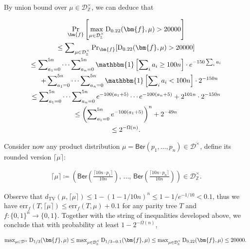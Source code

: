 By union bound over $\mu\in\mathcal{D}^{\times}_{\mathbb{Z}}$, we can deduce that\par


\[\begin{gathered}
\displaystyle\Pr_{\bm{f}}\left[\max_{\mu\in\mathcal{D}^{\times}_{\mathbb{Z}}}{\textup{D}}_{0.22}(\bm{f},\mu)>20000\right] \\
\displaystyle\leq \displaystyle\sum\nolimits_{\mu\in\mathcal{D}^{\times}_{\mathbb{Z}}}\Pr\nolimits_{\bm{f}}[{\textup{D}}_{0.22}(\bm{f},\mu)>20000] \\
\displaystyle\leq \displaystyle\sum\nolimits_{a_{1}=0}^{5n}\cdots\sum\nolimits_{a_{n}=0}^{5n}\mathbbm{1}\left[\sum\nolimits_{i}a_{i}\geq 100n\right]\cdot e^{-150\sum_{i}a_{i}} \\
\displaystyle\quad+\sum\nolimits_{a_{1}=0}^{5n}\cdots\sum\nolimits_{a_{n}=0}^{5n}\mathbbm{1}\left[\sum\nolimits_{i}a_{i}<100n\right]\cdot 2^{-150n} \\
\displaystyle\leq \displaystyle\sum\nolimits_{a_{1}=0}^{5n}\cdots\sum\nolimits_{a_{n}=0}^{5n}e^{-100(a_{1}+5)}\cdots e^{-100(a_{n}+5)}+2^{101n}\cdot 2^{-150n} \\
\displaystyle\leq \displaystyle\left(\sum\nolimits_{a_{1}=0}^{5n}e^{-100(a_{1}+5)}\right)^{n}+2^{-49n} \\
\displaystyle\leq \displaystyle 2^{-\Omega(n)}.
\end{gathered}\]


Consider now any product distribution $\mu=\mathsf{Ber}(p_{1},\ldots,p_{n})\in\mathcal{D}^{\times}$, define its rounded version $\lceil\mu\rceil$:\par


\[\begin{gathered}
\lceil\mu\rceil\coloneqq\left(\mathsf{Ber}\left(\frac{\lceil 10n\cdot p_{1}\rceil}{10n}\right),\,\ldots,\,\mathsf{Ber}\left(\frac{\lceil 10n\cdot p_{n}\rceil}{10n}\right)\right)\in\mathcal{D}^{\times}_{\mathbb{Z}}.
\end{gathered}\]


Observe that $d_{\mathrm{TV}}(\mu,\lceil\mu\rceil)\leq 1-(1-1/10n)^{n}\leq 1-1/e^{-1/10}<0.1$, thus we have $\mathrm{err}_{f}(T,\lceil\mu\rceil)\leq\mathrm{err}_{f}(T,\mu)+0.1$ for any parity tree $T$ and $f:\{0,1\}^{n}\to\{0,1\}$.
Together with the string of inequalities developed above, we conclude that with probability at least $1-2^{-\Omega(n)}$,\par


\[\begin{gathered}
\max\nolimits_{\mu\in\mathcal{D}^{\times}}{\textup{D}}_{1/3}(\bm{f},\mu)\leq\max\nolimits_{\mu\in\mathcal{D}^{\times}_{\mathbb{Z}}}{\textup{D}}_{1/3-0.1}(\bm{f},\mu)\leq\max\nolimits_{\mu\in\mathcal{D}^{\times}_{\mathbb{Z}}}{\textup{D}}_{0.22}(\bm{f},\mu)\leq 20000.\
\end{gathered}\]


